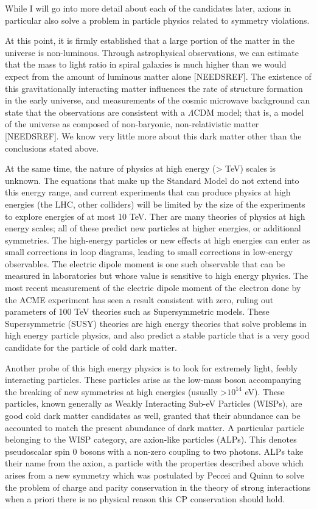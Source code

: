 \documentclass[12pt,twosides]{book}
\begin{document}
\begin{description}
While I will go into more detail about each of the candidates later, axions in particular also solve a problem in particle physics related to symmetry violations. 




At this point, it is firmly established that a large portion of the matter in the universe is non-luminous. Through astrophysical observations, we can estimate that the mass to light ratio in spiral galaxies is much higher than we would expect from the amount of luminous matter alone [NEEDSREF]. The existence of this gravitationally interacting matter influences the rate of structure formation in the early universe, and measurements of the cosmic microwave background can state that the observations are consistent with a $\Lambda$CDM model; that is, a model of the universe as composed of non-baryonic, non-relativistic matter [NEEDSREF]. We know very little more about this dark matter other than the conclusions stated above.

At the same time, the nature of physics at high energy (> TeV) scales is unknown. The equations that make up the Standard Model do not extend into this energy range, and current experiments that can produce physics at high energies (the LHC, other colliders) will be limited by the size of the experiments to explore energies of at most 10 TeV. Ther are many theories of physics at high energy scales; all of these predict new particles at higher energies, or additional symmetries. The high-energy particles or new effects at high energies can enter as small corrections in loop diagrams, leading to small corrections in low-energy observables. The electric dipole moment is one such observable that can be measured in laboratories but whose value is sensitive to high energy physics. The most recent measurement of the electric dipole moment of the electron \cite{acme14} done by the ACME experiment has seen a result consistent with zero, ruling out parameters of 100 TeV theories such as Supersymmetric models. These Supersymmetric (SUSY) theories are high energy theories that solve problems in high energy particle physics, and also predict a stable particle that is a very good candidate for the particle of cold dark matter.

Another probe of this high energy physics is to look for extremely light, feebly interacting particles. These particles arise as the low-mass boson accompanying the breaking of new symmetries at high energies (usually >$10^{14}$ eV). These particles, known generally as Weakly Interacting Sub-eV Particles (WISPs), are good cold dark matter candidates as well, granted that their abundance can be accounted to match the present abundance of dark matter. A particular particle belonging to the WISP category, are axion-like particles (ALPs). This denotes pseudoscalar spin 0 bosons with a non-zero coupling to two photons. ALPs take their name from the axion, a particle with the properties described above which arises from a new symmetry which was postulated by Peccei and Quinn \cite{peccei77} to solve the problem of charge and parity conservation in the theory of strong interactions when a priori there is no physical reason this CP conservation should hold.


\end{description}
\end{document}

